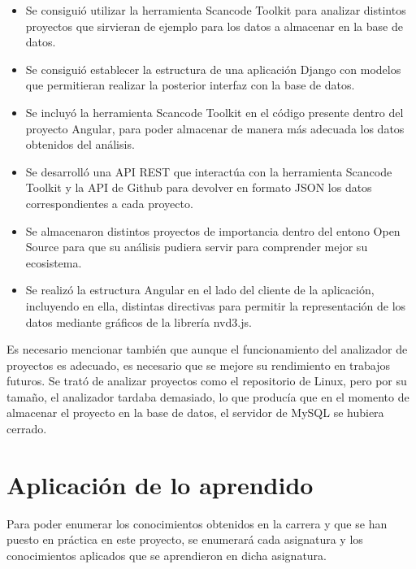 \documentclass[a4paper, spanish, 12pt]{book}
\begin{document}
\begin{itemize}

\item Se consigui\'o utilizar la herramienta Scancode Toolkit para analizar distintos
proyectos que sirvieran de ejemplo para los datos a almacenar en la base de datos.

\item Se consigui\'o establecer la estructura de una aplicaci\'on Django con modelos
que permitieran realizar la posterior interfaz con la base de datos.

\item Se incluy\'o la herramienta Scancode Toolkit en el c\'odigo presente dentro del
proyecto Angular, para poder almacenar de manera m\'as adecuada los datos obtenidos
del an\'alisis.

\item Se desarroll\'o una API REST que interact\'ua con la herramienta Scancode Toolkit
y la API de Github para devolver en formato JSON los datos correspondientes a cada
proyecto.

\item Se almacenaron distintos proyectos de importancia dentro del entono Open Source
para que su an\'alisis pudiera servir para comprender mejor su ecosistema.

\item Se realiz\'o la estructura Angular en el lado del cliente de la aplicaci\'on,
incluyendo en ella, distintas directivas para permitir la representaci\'on de los datos
mediante gr\'aficos de la librer\'ia nvd3.js.

\end{itemize}

Es necesario mencionar tambi\'en que aunque el funcionamiento del analizador de
proyectos es adecuado, es necesario que se mejore su rendimiento en
trabajos futuros. Se trat\'o de analizar proyectos como el repositorio de Linux,
pero por su tama\~no, el analizador tardaba demasiado, lo que produc\'ia que en el
momento de almacenar el proyecto en la base de datos, el servidor de MySQL se hubiera
cerrado.

\section{Aplicaci\'on de lo aprendido}
\label{sec:aplicacion}

Para poder enumerar los conocimientos obtenidos en la carrera y que se han puesto
en pr\'actica en este proyecto, se enumerar\'a cada asignatura y los conocimientos
aplicados que se aprendieron en dicha asignatura.
\end{document}
